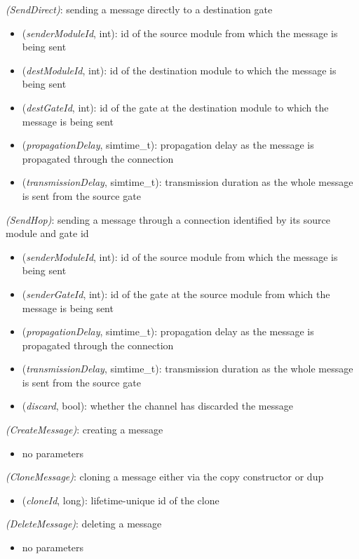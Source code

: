  \textit{(SendDirect)}: sending a message directly to a destination gate

\begin{itemize}
  \item {} (\textit{senderModuleId}, int): id of the source module from which the message is being sent
  \item {} (\textit{destModuleId}, int): id of the destination module to which the message is being sent
  \item {} (\textit{destGateId}, int): id of the gate at the destination module to which the message is being sent
  \item {} (\textit{propagationDelay}, simtime\_t): propagation delay as the message is propagated through the connection
  \item {} (\textit{transmissionDelay}, simtime\_t): transmission duration as the whole message is sent from the source gate
\end{itemize}

 \textit{(SendHop)}: sending a message through a connection identified by its source module and gate id

\begin{itemize}
  \item {} (\textit{senderModuleId}, int): id of the source module from which the message is being sent
  \item {} (\textit{senderGateId}, int): id of the gate at the source module from which the message is being sent
  \item {} (\textit{propagationDelay}, simtime\_t): propagation delay as the message is propagated through the connection
  \item {} (\textit{transmissionDelay}, simtime\_t): transmission duration as the whole message is sent from the source gate
  \item {} (\textit{discard}, bool): whether the channel has discarded the message
\end{itemize}

 \textit{(CreateMessage)}: creating a message

\begin{itemize}
  \item no parameters
\end{itemize}

 \textit{(CloneMessage)}: cloning a message either via the copy constructor or dup

\begin{itemize}
  \item {} (\textit{cloneId}, long): lifetime-unique id of the clone
\end{itemize}

 \textit{(DeleteMessage)}: deleting a message

\begin{itemize}
  \item no parameters
\end{itemize}

